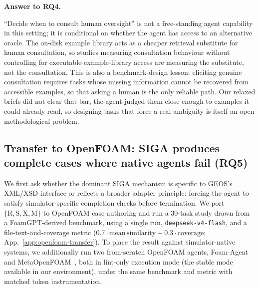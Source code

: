 \documentclass{article}
\newif\ifrqfancy
\newenvironment{rqanswer}[1]{%
  \ifrqfancy\begin{rqbox}\fi\noindent\textbf{Answer to #1.}\ %
}{%
  \ifrqfancy\end{rqbox}\else\par\smallskip\fi%
}
\begin{document}
\begin{rqanswer}{RQ4}
``Decide when to consult human oversight'' is not a free-standing agent capability in this setting; it is conditional on whether the agent has access to an alternative oracle. The on-disk example library acts as a cheaper retrieval substitute for human consultation, so studies measuring consultation behaviour without controlling for executable-example-library access are measuring the substitute, not the consultation. This is also a benchmark-design lesson: eliciting genuine consultation requires tasks whose missing information cannot be recovered from accessible examples, so that asking a human is the only reliable path. Our relaxed briefs did not clear that bar, the agent judged them close enough to examples it could already read, so designing tasks that force a real ambiguity is itself an open methodological problem.
\end{rqanswer}

\subsection{Transfer to OpenFOAM: SIGA produces complete cases where native agents fail (RQ5)}
\label{subsec:openfoam-transfer}

We first ask whether the dominant SIGA mechanism is specific to GEOS's XML/XSD interface or reflects a broader adapter principle: forcing the agent to satisfy simulator-specific completion checks before termination. We port $\{\mathrm{R,S,X,M}\}$ to OpenFOAM case authoring and run a 30-task study drawn from a FoamGPT-derived benchmark, using a single run, \texttt{deepseek-v4-flash}, and a file-text-and-coverage metric ($0.7\cdot\mathrm{mean\,similarity} + 0.3\cdot\mathrm{coverage}$; App.~\ref{app:openfoam-transfer}). To place the result against simulator-native systems, we additionally run two from-scratch OpenFOAM agents, Foam-Agent~\citep{foamagent2025} and MetaOpenFOAM~\citep{chen2024metaopenfoam}, both in lint-only execution mode (the stable mode available in our environment), under the same benchmark and metric with matched token instrumentation.
\end{document}
